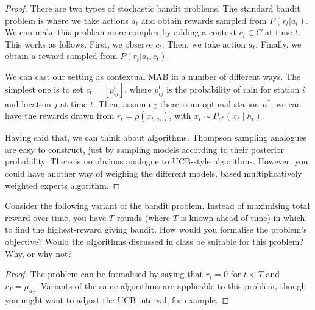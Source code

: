 \documentclass[twoside,a4paper]{article}
\begin{document}
\begin{proof}
  There are two types of stochastic bandit problems. The standard
  bandit problem is where we take actions $a_t$ and obtain rewards
  sampled from $P(r_t | a_t)$. We can make this problem more complex
  by adding a context $c_t \in C$ at time $t$. This works as follows.
  First, we observe $c_t$. Then, we take action $a_t$. Finally, we
  obtain a reward sampled from $P(r_t | a_t, c_t)$.

  We can cast our setting as contextual MAB in a number of different ways. The simplest one is to set $c_t = [p^t_{ij}]$, where $p^t_{ij}$ is the probability of rain for station $i$ and location $j$ at time $t$. Then, assuming there is an optimal station $\mu^*$, we can have the rewards drawn from $r_t = \rho(x_{t,a_t})$, with $x_t \sim P_{\mu^*}(x_t \mid h_t)$.

  Having said that, we can think about algorithms. Thompson sampling analogues are easy to construct, just by sampling models\marker{} according to their posterior probability. There is no obvious analogue to UCB-style algorithms. However, you could have another way of weighing the different models\marker{}, based multiplicatively weighted experts algorithm.
\end{proof}

\begin{exercise}
  Consider the following variant of the bandit problem.  Instead of maximising total reward over time, you have $T$ rounds (where $T$ is known ahead of time) in which to find the highest-reward giving bandit. How would you formalise the problem's objective? Would the algorithms discussed in class be suitable for this problem? Why, or why not?
\end{exercise}
\begin{proof}
  The problem can be formalised by saying that $r_t = 0$ for $t < T$ and $r_T = \mu_{a_{T}}$. Variants of the same algorithms are applicable to this problem, though you might want to adjust the UCB interval, for example. 
\end{proof}
\fi
\end{document}
